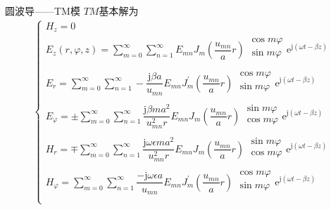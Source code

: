 \begin{frame}{圆波导——TM模}
    $TM$基本解为
    \begin{align*}
        \begin{cases}
            H_z=0                                     \\
            E_z(r,\varphi,z)=\sum\limits_{m=0}^{\infty}\sum\limits_{n=1}^{\infty}E_{mn}J_m\left(\dfrac{u_{mn}}{a}r\right)
            \begin{matrix*}
                \cos m\varphi\\
                \sin m\varphi\\
            \end{matrix*}
            \mathrm{e}^{\mathrm{j}(\omega t-\beta z)} \\
            E_r=\sum\limits_{m=0}^{\infty}\sum\limits_{n=1}^{\infty}-\dfrac{\mathrm{j}\beta a}{u_{mn}}E_{mn}J_m^{'}\left(\dfrac{u_{mn}}{a}r\right)
            \begin{matrix*}
                \cos m\varphi\\
                \sin m\varphi\\
            \end{matrix*}
            \mathrm{e}^{\mathrm{j}(\omega t-\beta z)} \\
            E_{\varphi}=\pm\sum\limits_{m=0}^{\infty}\sum\limits_{n=1}^{\infty}\dfrac{\mathrm{j}\beta ma^2}{u_{mn}^{2}r}E_{mn}J_m\left(\dfrac{u_{mn}}{a}r\right)
            \begin{matrix*}
                \sin m\varphi\\
                \cos m\varphi\\
            \end{matrix*}
            \mathrm{e}^{\mathrm{j}(\omega t-\beta z)} \\
            H_r=\mp\sum\limits_{m=0}^{\infty}\sum\limits_{n=1}^{\infty}\dfrac{\mathrm{j}\omega\epsilon ma^2}{u_{mn}^{2}r}E_{mn}J_m\left(\dfrac{u_{mn}}{a}r\right)
            \begin{matrix*}
                \sin m\varphi\\
                \cos m\varphi\\
            \end{matrix*}
            \mathrm{e}^{\mathrm{j}(\omega t-\beta z)} \\
            H_{\varphi}=\sum\limits_{m=0}^{\infty}\sum\limits_{n=1}^{\infty}\dfrac{-\mathrm{j}\omega\epsilon a}{u_{mn}}E_{mn}J_m^{'}\left(\dfrac{u_{mn}}{a}r\right)
            \begin{matrix*}
                \cos m\varphi\\
                \sin m\varphi\\
            \end{matrix*}
            \mathrm{e}^{\mathrm{j}(\omega t-\beta z)} \\
        \end{cases}
    \end{align*}
\end{frame}

